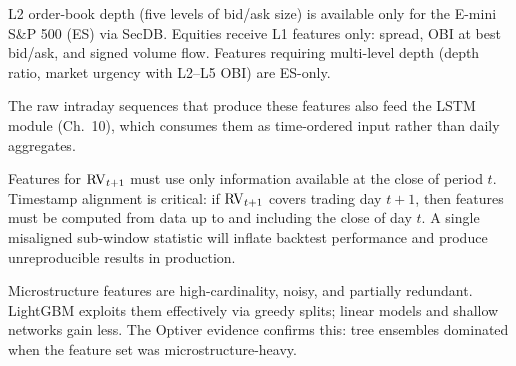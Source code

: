 L2 order-book depth (five levels of bid/ask size) is available only for the E-mini S\&P 500 (ES) via SecDB.
Equities receive L1 features only: spread, OBI at best bid/ask, and signed volume flow.
Features requiring multi-level depth (depth ratio, market urgency with L2--L5 OBI) are ES-only.

The raw intraday sequences that produce these features also feed the LSTM module (Ch.~10), which consumes them as time-ordered input rather than daily aggregates.



\begin{warning}
Features for $\operatorname{RV}_{t+1}$ must use only information available at the close of period $t$.
Timestamp alignment is critical: if $\operatorname{RV}_{t+1}$ covers trading day $t+1$, then features must be computed from data up to and including the close of day $t$.
A single misaligned sub-window statistic will inflate backtest performance and produce unreproducible results in production.
\end{warning}

\begin{keyidea}
Microstructure features are high-cardinality, noisy, and partially redundant.
LightGBM exploits them effectively via greedy splits; linear models and shallow networks gain less.
The Optiver evidence confirms this: tree ensembles dominated when the feature set was microstructure-heavy.
\end{keyidea}
